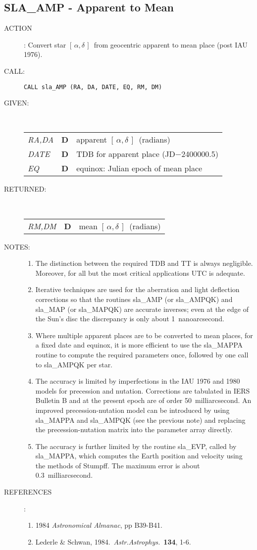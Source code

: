 \documentclass[11pt,twoside]{article}
\newcommand{\xlabel}[1]{}
\newcommand{\radec}     {$[\,\alpha,\delta\,]$}
\newcommand{\routine}[3]
{\hbadness=10000
  \vbox
  {
    \rule{\textwidth}{0.3mm}\\
    {\Large {\bf #1} \hfill #2 \hfill {\bf #1}}\\
    \setlength{\oldspacing}{\topsep}
    \setlength{\topsep}{0.3ex}
    \begin{description}
      #3
    \end{description}
    \setlength{\topsep}{\oldspacing}
  }
}
\renewcommand{\routine}[3]
   {
      \subsection{#1\xlabel{#1} - #2\label{#1}}
       \begin{description}
         #3
       \end{description}
   }
\newcommand{\action}[1]
{\item[ACTION]: #1}
\newcommand{\action}[1]
   {\item[ACTION:] #1}
\newcommand{\call}[1]
{\item[CALL]: \hspace{0.4em}{\tt #1}}
\newlength{\oldspacing}
\renewcommand{\call}[1]
   {
    \item[CALL:] {\tt #1}
   }
\newcommand{\args}[2]
{
  \goodbreak
  \setlength{\oldspacing}{\topsep}
  \setlength{\topsep}{0.3ex}
  \begin{description}
  \item[#1]:\\[1.5ex]
    \begin{tabular}{p{7em}p{6em}p{22em}}
      #2
    \end{tabular}
  \end{description}
  \setlength{\topsep}{\oldspacing}
}
\renewcommand{\args}[2]
   {
     \begin{description}
        \item[#1:]\\
        \begin{tabular}{p{7em}p{6em}l}
           #2
        \end{tabular}
     \end{description}
   }
\newcommand{\spec}[3]
{
  {\em {#1}} & {\bf \mbox{#2}} & {#3}
}
\newcommand{\notes}[1]
{
  \goodbreak
  \setlength{\oldspacing}{\topsep}
  \setlength{\topsep}{0.3ex}
  \begin{description}
    \item[NOTES]:
        #1
  \end{description}
  \setlength{\topsep}{\oldspacing}
}
\renewcommand{\notes}[1]
   {
      \begin{description}
         \item[NOTES:]
            #1
      \end{description}
   }
\newcommand{\refs}[1]
{
  \goodbreak
  \setlength{\oldspacing}{\topsep}
  \setlength{\topsep}{0.3ex}
  \begin{description}
    \item[REFERENCES]:
        #1
  \end{description}
  \setlength{\topsep}{\oldspacing}
}
\newcommand{\refs}[1]
   {
     \begin{description}
       \item[REFERENCES:]
           #1
     \end{description}
   }
\begin{document}
\routine{SLA\_AMP}{Apparent to Mean}
{
 \action{Convert star \radec\ from geocentric apparent to
         mean place (post IAU 1976).}
 \call{CALL sla\_AMP (RA, DA, DATE, EQ, RM, DM)}
}
\args{GIVEN}
{
 \spec{RA,DA}{D}{apparent \radec\ (radians)} \\
 \spec{DATE}{D}{TDB for apparent place (JD$-$2400000.5)} \\
 \spec{EQ}{D}{equinox:  Julian epoch of mean place}
}
\args{RETURNED}
{
 \spec{RM,DM}{D}{mean \radec\ (radians)}
}
\notes
{
 \begin{enumerate}
  \item The distinction between the required TDB and TT is
        always negligible.  Moreover, for all but the most
        critical applications UTC is adequate.
  \item Iterative techniques are used for the aberration and
        light deflection corrections so that the routines
        sla\_AMP (or sla\_AMPQK) and sla\_MAP (or sla\_MAPQK) are
        accurate inverses;  even at the edge of the Sun's disc
        the discrepancy is only about 1~nanoarcsecond.
  \item Where multiple apparent places are to be converted to
        mean places, for a fixed date and equinox, it is more
        efficient to use the sla\_MAPPA routine to compute the
        required parameters once, followed by one call to
        sla\_AMPQK per star.
  \item The accuracy is limited by imperfections in the IAU 1976
        and 1980 models for precession and nutation. Corrections
        are tabulated in IERS Bulletin B and at the present epoch
        are of order 50~milliarcsecond. An improved precession-nutation
        model can be introduced by using sla\_MAPPA and sla\_AMPQK (see
        the previous note) and replacing the precession-nutation
        matrix into the parameter array directly.
  \item The accuracy is further limited by the routine sla\_EVP, called
        by sla\_MAPPA, which computes the Earth position and
        velocity using the methods of Stumpff.  The maximum
        error is about 0.3~milliarcsecond.
 \end{enumerate}
}
\refs
{
 \begin{enumerate}
  \item 1984 {\it Astronomical Almanac}, pp B39-B41.
  \item Lederle \& Schwan, 1984.\ {\it Astr.Astrophys.}\ {\bf 134}, 1-6.
 \end{enumerate}
}
\end{document}
